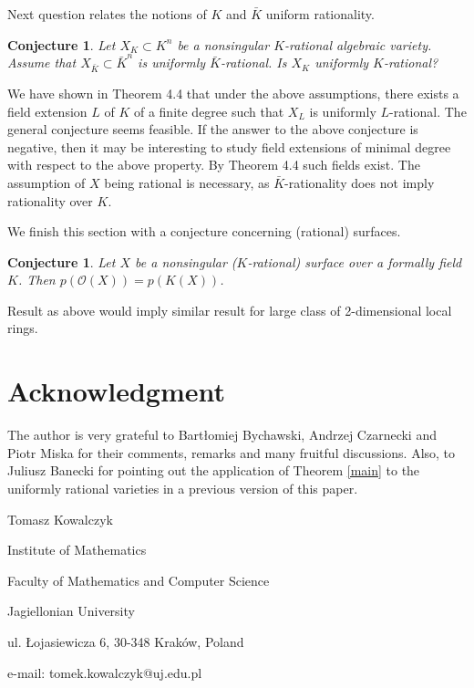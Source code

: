\documentclass[12pt,reqno]{amsart}   	%
\theoremstyle{obs}
\theoremstyle{prob}
\theoremstyle{conj}
\newtheorem{conj}[thm]{Conjecture}
\theoremstyle{remark}
\newcommand{\OO}{\mathcal{O}}
\begin{document}
Next question relates the notions of $K$ and $\bar{K}$ uniform rationality.
\begin{conj}
Let $X_K \subset K^n$ be a nonsingular $K$-rational algebraic variety. Assume that $ X_{\bar{K}} \subset \bar{K}^n$ is uniformly $\bar{K}$-rational. Is $X_K$ uniformly $K$-rational?
 \end{conj}
We have shown in Theorem 4.4 that under the above assumptions, there exists a field extension $L$ of $K$ of a finite degree
such that $X_L$ is uniformly $L$-rational. The general conjecture seems feasible.
If the answer to the above conjecture is negative, then it may be interesting to study field extensions of minimal degree with respect to the above property. By Theorem 4.4 such fields exist. 
The assumption of $X$ being rational is necessary, as $\bar{K}$-rationality does not imply rationality over $K$.



We finish this section with a conjecture concerning (rational) surfaces.
\begin{conj}
Let $X$ be a nonsingular ($K$-rational) surface over a formally field $K$. Then $p(\OO(X))=p(K(X))$.

\end{conj}
Result as above would imply similar result for large class of 2-dimensional local rings.



\section*{Acknowledgment}
The author is very grateful to Bartłomiej Bychawski, Andrzej Czarnecki and Piotr Miska for their comments, remarks and many fruitful discussions. Also, to Juliusz Banecki for pointing out the application of Theorem \ref{main} to the uniformly rational varieties in a previous version of this paper.













\begin{small}



\vspace{5pt}

\noindent
Tomasz Kowalczyk

\noindent
Institute of Mathematics

\noindent
Faculty of Mathematics and Computer Science

\noindent
Jagiellonian University

\noindent
ul. Łojasiewicza 6, 30-348 Kraków, Poland

\noindent
e-mail: tomek.kowalczyk@uj.edu.pl



\end{small}	
\end{document}
